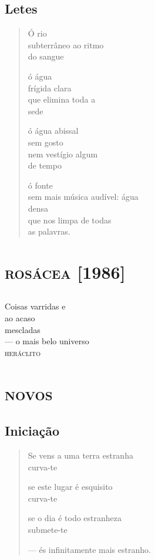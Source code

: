 \chapter{Letes}

\begin{verse}
Ó rio\\
subterrâneo ao ritmo\\
do sangue

ó água\\
frígida clara\\
que elimina toda a\\
sede

ó água abissal\\
sem gosto\\
nem vestígio algum\\
de tempo

ó fonte\\
sem mais música audível: água\\
\qquad\qquad\qquad\qquad densa\\
que nos limpa de todas\\
as palavras.
\end{verse}

\part{\textsc{rosácea} {[}1986{]}}

\chapter*{}
\thispagestyle{empty}
\mbox{}
\vspace*{\fill}
\hfill Coisas varridas e\\
\hfill ao acaso\\
\hfill mescladas\\
\hfill --- o mais belo universo\\
\hfill \textsc{heráclito}
\vspace*{\fill}

\part*{\textsc{novos}}

\chapter{Iniciação}

\begin{verse}
Se vens a uma terra estranha\\
curva-te

se este lugar é esquisito\\
curva-te

se o dia é todo estranheza\\
submete-te

--- és infinitamente mais estranho.
\end{verse}

